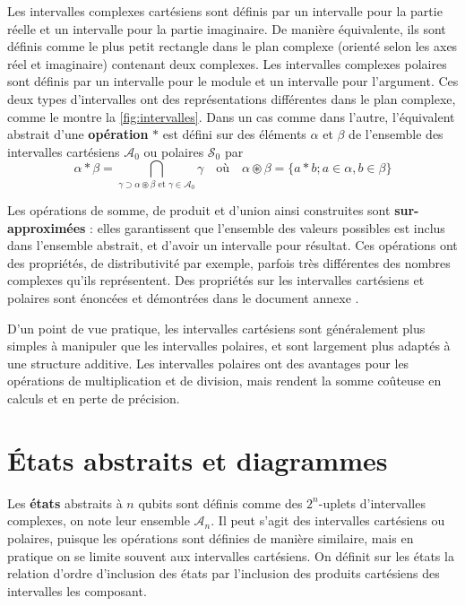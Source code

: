 Les intervalles complexes cartésiens sont définis par un intervalle pour la partie réelle et un intervalle pour la partie imaginaire. De manière équivalente, ils sont définis comme le plus petit rectangle dans le plan complexe (orienté selon les axes réel et imaginaire) contenant deux complexes. Les intervalles complexes polaires sont définis par un intervalle pour le module et un intervalle pour l'argument. Ces deux types d'intervalles ont des représentations différentes dans le plan complexe, comme le montre la \autoref{fig:intervalles}. Dans un cas comme dans l'autre, l'équivalent abstrait d'une \textbf{opération} $*$ est défini sur des éléments $\alpha$ et $\beta$ de l'ensemble des intervalles cartésiens $\mathcal{A}_0$ ou polaires $\mathcal S_0$ par
$$\alpha * \beta = \bigcap_{\gamma \supset \alpha \circledast \beta\text{ et }\gamma \in \mathcal{A}_0} \gamma \quad \text{où} \quad \alpha \circledast \beta = \{a * b ; a \in \alpha, b \in \beta\}$$

Les opérations de somme, de produit et d'union ainsi construites sont \textbf{sur-approximées} : elles garantissent que l'ensemble des valeurs possibles est inclus dans l'ensemble abstrait, et d'avoir un intervalle pour résultat. Ces opérations ont des propriétés, de distributivité par exemple, parfois très différentes des nombres complexes qu'ils représentent. Des propriétés sur les intervalles cartésiens et polaires sont énoncées et démontrées dans le document annexe \cite{Leroy_2025}.

D'un point de vue pratique, les intervalles cartésiens sont généralement plus simples à manipuler que les intervalles polaires, et sont largement plus adaptés à une structure additive. Les intervalles polaires ont des avantages pour les opérations de multiplication et de division, mais rendent la somme coûteuse en calculs et en perte de précision.

\section{États abstraits et diagrammes}

Les \textbf{états} abstraits à $n$ qubits sont définis comme des $2^n$-uplets d'intervalles complexes, on note leur ensemble $\mathcal A_n$.
Il peut s'agit des intervalles cartésiens ou polaires, puisque les opérations sont définies de manière similaire, mais en pratique on se limite souvent aux intervalles cartésiens.
On définit sur les états la relation d'ordre d'inclusion des états par l'inclusion des produits cartésiens des intervalles les composant.

